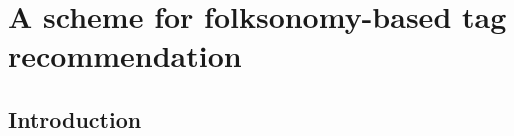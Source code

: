 
\chapter[A scheme for folksonomy-based tag recommendation][A scheme for folksonomy-based tag rec.]{A scheme for folksonomy-based tag recommendation}
\label{sec:general}

\section{Introduction}
\label{sec:general:introduction}



